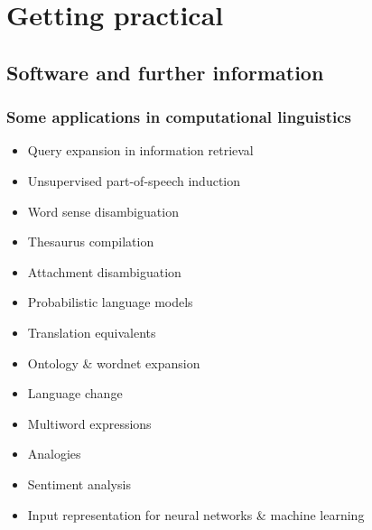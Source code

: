 \documentclass[t]{beamer} %
\begin{document}
\section{Getting practical}

\subsection{Software and further information}

\begin{frame}
  \frametitle{Some applications in computational linguistics}

  \ungap[1.5]
  \begin{itemize}
  \item Query expansion in information retrieval \citep{Grefenstette:94}
  \item Unsupervised part-of-speech induction \citep{Schuetze:95}
  \item Word sense disambiguation \citep{Schuetze:98,Rapp:04b}
  \item Thesaurus compilation \citep{Lin:98b,Rapp:04a}
  \item Attachment disambiguation \citep*{Pantel:Lin:00}
  \item Probabilistic language models \citep{Bengio:etc:03b}
  \item Translation equivalents \citep{Sahlgren:Karlgren:05}
  \item Ontology \& wordnet expansion \citep{Pantel:etc:09}
  \item Language change \citep{Sagi:Kaufmann:Clark:09,Hamilton:Leskovec:Jurafsky:16}
  \item Multiword expressions \citep{Kiela:Clark:13}
  \item Analogies \citep{Turney:13,Gladkova:Drozd:Matsuoka:16}
  \item Sentiment analysis \citep{Rothe:Schuetze:16,Yu:etc:17}
  \item[\hand] Input representation for neural networks \& machine learning
  \end{itemize}
\end{frame}
\end{document}

